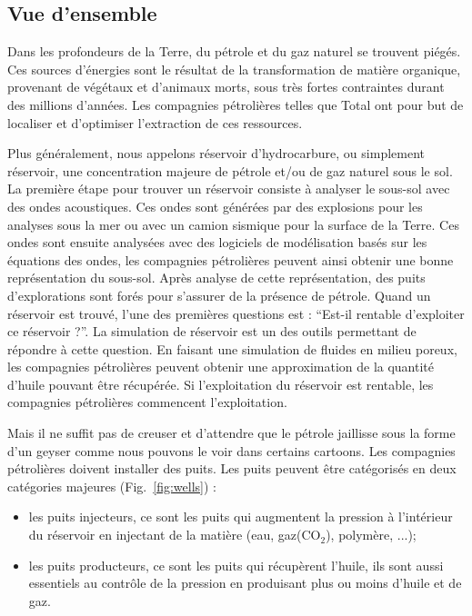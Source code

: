 \subsection{Vue d'ensemble}
Dans les profondeurs de la Terre, du pétrole et du gaz naturel se trouvent piégés.
%
Ces sources d'énergies sont le résultat de la transformation de matière organique, provenant de végétaux et d'animaux morts, sous très fortes contraintes durant des millions d'années.
%
Les compagnies pétrolières telles que Total ont pour but de localiser et d'optimiser l'extraction de ces ressources.


Plus généralement, nous appelons réservoir d'hydrocarbure, ou simplement réservoir, une concentration majeure de pétrole et/ou de gaz naturel sous le sol.
%
La première étape pour trouver un réservoir consiste à analyser le sous-sol avec des ondes acoustiques.
%
Ces ondes sont générées par des explosions pour les analyses sous la mer ou avec un camion sismique pour la surface de la Terre.
%
Ces ondes sont ensuite analysées avec des logiciels de modélisation basés sur les équations des ondes, les compagnies pétrolières peuvent ainsi obtenir une bonne représentation du sous-sol.
%
Après analyse de cette représentation, des puits d'explorations sont forés pour s'assurer de la présence de pétrole.
%
Quand un réservoir est trouvé, l'une des premières questions est : ``Est-il rentable d'exploiter ce réservoir ?''.
%
La simulation de réservoir est un des outils permettant de répondre à cette question.
%
En faisant une simulation de fluides en milieu poreux, les compagnies pétrolières peuvent obtenir une approximation de la quantité d'huile pouvant être récupérée.
%
Si l'exploitation du réservoir est rentable, les compagnies pétrolières commencent l'exploitation.


Mais il ne suffit pas de creuser et d'attendre que le pétrole jaillisse sous la forme d'un geyser comme nous pouvons le voir dans certains cartoons.
%
Les compagnies pétrolières doivent installer des puits.
%
Les puits peuvent être catégorisés en deux catégories majeures (Fig.~\ref{fig:wells}) :
%
\begin{itemize}
  \item les puits injecteurs, ce sont les puits qui augmentent la pression à l'intérieur du réservoir en injectant de la matière (eau, gaz(CO$_2$), polymère, ...);
  \item les puits producteurs, ce sont les puits qui récupèrent l'huile, ils sont aussi essentiels au contrôle de la pression en produisant plus ou moins d'huile et de gaz.
\end{itemize}

